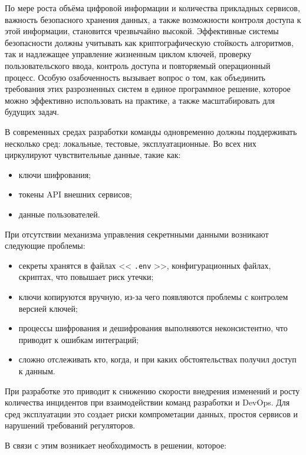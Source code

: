 \documentclass[14pt, a4paper]{extarticle}
\renewcommand{\texttt}[1]{%
  {\def\UrlFont{\ttfamily}\nolinkurl{#1}}%
}
\begin{document}
	
	По мере роста объёма цифровой информации и количества прикладных сервисов, важность безопасного хранения данных, а также возможности контроля доступа к этой информации, становится чрезвычайно высокой. Эффективные системы безопасности должны учитывать как криптографическую стойкость алгоритмов, так и надлежащее управление жизненным циклом ключей, проверку пользовательского ввода, контроль доступа и повторяемый операционный процесс. Особую озабоченность вызывает вопрос о том, как объединить требования этих разрозненных систем в единое программное решение, которое можно эффективно использовать на практике, а также масштабировать для будущих задач.
	
	В современных средах разработки команды одновременно должны поддерживать несколько сред: локальные, тестовые, эксплуатационные. Во всех них циркулируют чувствительные данные, такие как:

	\begin{itemize}
	\item ключи шифрования;
	\item токены API внешних сервисов;
	\item данные пользователей.
	\end{itemize}
	
	При отсутствии механизма управления секретнными данными возникают следующие проблемы:
	
	\begin{itemize}
	\item секреты хранятся в файлах <<\texttt{.env}>>, конфигурационных файлах, скриптах, что повышает риск утечки;
	\item ключи копируются вручную, из-за чего появляются проблемы с контролем версией ключей;
	\item процессы шифрования и дешифрования выполняются неконсистентно, что приводит к ошибкам интеграций;
	\item сложно отслеживать кто, когда, и при каких обстоятельствах получил доступ к данным.
	\end{itemize}
	
	При разработке это приводит к снижению скорости внедрения изменений и росту количества инцидентов при взаимодействии команд разработки и DevOps. Для сред эксплуатации это создает риски компрометации данных, простоя сервисов и нарушений требований регуляторов.
	
	В связи с этим возникает необходимость в решении, которое:
	
\end{document}
